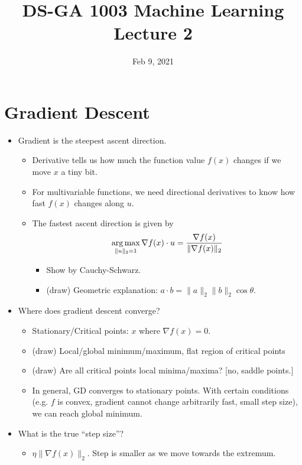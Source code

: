 \documentclass[11pt]{article}
\begin{document}
\title{DS-GA 1003 Machine Learning \\ Lecture 2}
\date{Feb 9, 2021}
\maketitle

\section{Gradient Descent}
\begin{itemize}
    \item Gradient is the steepest ascent direction.
        \begin{itemize}
            \item Derivative tells us how much the function value $f(x)$ changes if we move $x$ a tiny bit.
            \item For multivariable functions, we need directional derivatives to know how fast $f(x)$ changes along $u$.
            \item The fastest ascent direction is given by
                $$
                \operatorname*{arg\,max}_{\|u\|_2=1} \nabla f(x) \cdot u = \frac{\nabla f(x)}{\|\nabla f(x)\|_2}
                $$
                \begin{itemize}
                    \item Show by Cauchy-Schwarz.
                    \item (draw) Geometric explanation: $a\cdot b = \|a\|_2\|b\|_2\cos\theta$.
                \end{itemize}
        \end{itemize}

    \item Where does gradient descent converge?
        \begin{itemize}
            \item Stationary/Critical points: $x$ where $\nabla f(x) = 0$.
            \item (draw) Local/global minimum/maximum, flat region of critical points
            \item (draw) Are all critical points local minima/maxima? [no, saddle points.]
            \item In general, GD converges to stationary points. With certain conditions (e.g. $f$ is convex, gradient cannot change arbitrarily fast, small step size), we can reach global minimum.
        \end{itemize}

    \item What is the true ``step size''?
        \begin{itemize}
            \item $\eta\|\nabla f(x)\|_2$. Step is smaller as we move towards the extremum. 
        \end{itemize}


\end{itemize}
\end{document}
